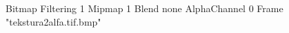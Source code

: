 {Bitmap
	{Filtering 1}
	{Mipmap 1}
	{Blend none}
	{AlphaChannel 0}
	{Frame "tekstura2alfa.tif.bmp"}
}
